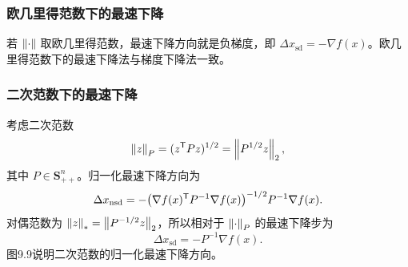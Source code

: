 \subsubsection*{欧几里得范数下的最速下降}
若 $\left\lVert \cdot\right\rVert$ 取欧几里得范数，最速下降方向就是负梯度，即 $\Delta x_{\mathrm{sd}}=-\nabla f(x)$。欧几里得范数下的最速下降法与梯度下降法一致。

\subsubsection*{二次范数下的最速下降}
考虑二次范数
\[
\left\lVert z\right\rVert_P=(z^\mathsf T Pz)^{1/2}=\left\lVert P^{1/2}z\right\rVert_2,
\]
其中 $P\in\mathbf S_{++}^n$。归一化最速下降方向为
\[
\Delta x_{\mathrm{nsd}}
=-\bigl(\nabla f(x)^\mathsf T P^{-1}\nabla f(x)\bigr)^{-1/2}P^{-1}\nabla f(x).
\]
对偶范数为 $\left\lVert z\right\rVert_*=\left\lVert P^{-1/2}z\right\rVert_2$，所以相对于 $\left\lVert \cdot\right\rVert_P$ 的最速下降步为
\begin{equation}
\Delta x_{\mathrm{sd}}=-P^{-1}\nabla f(x).\tag{9.25}
\end{equation}
图9.9说明二次范数的归一化最速下降方向。
